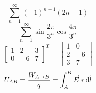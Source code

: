 \documentclass[a4paper]{article}
\begin{document}
\newline
$$
\sum_{n=1}^{\infty}{(-1)^{n+1}}(2n-1)
$$
$$
\sum_{n=1}^{\infty}\sin \frac{2{\pi}}{3^{n}} \cos \frac{4{\pi}}{3^{n}}
$$
\newline
$$
\left[
\begin{array}{lll}
1 & 2 & 3\\
0 & -6 & 7
\end{array}
\right]^{T} 
=
\left[
\begin{array}{ll}
1 & 0\\
2 & -6\\
3 & 7
\end{array}
\right]
$$
\newline
$$
U_{AB} = \frac {W_{A \rightarrow B}}{q} = \int_{A}^{B} \vec{E} * \vec{{\rm d}l}
$$
\end{document}
